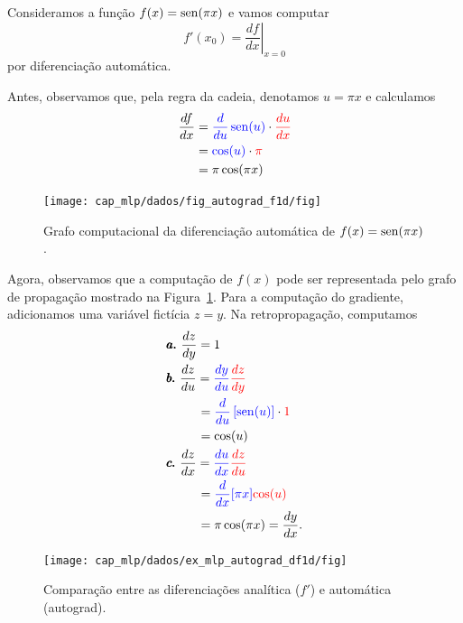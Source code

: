 \begin{ex}\label{ex:mlp_autograd_df1d}
  Consideramos a função $f(x) = \operatorname{sen}(\pi x)$ e vamos computar
  \begin{equation}
    f'(x_0) = \left.\frac{d f}{d x}\right|_{x=0}
  \end{equation}
  por diferenciação automática.

  Antes, observamos que, pela regra da cadeia, denotamos $u = \pi x$ e calculamos
  \begin{align}
    \frac{df}{dx} &= {\color{blue}\frac{d}{du}\operatorname{sen}(u)}\cdot{\color{red}\frac{d u}{dx}}\\
                  &= {\color{blue}\cos(u)}\cdot{\color{red}\pi} \\
                  &= \pi\cos(\pi x)
  \end{align}

  \begin{figure}[H]
    \centering
    \texttt{[image: cap\_mlp/dados/fig\_autograd\_f1d/fig]}
    \caption{Grafo computacional da diferenciação automática de $f(x) = \operatorname{sen}(\pi x)$.}
    \label{fig:autograd_f1d}
  \end{figure}  

  Agora, observamos que a computação de $f(x)$ pode ser representada pelo grafo de propagação mostrado na Figura~\ref{fig:autograd_f1d}. Para a computação do gradiente, adicionamos uma variável fictícia $z = y$. Na retropropagação, computamos
  \begin{subequations}
    \begin{align}
      &\pmb{a.} ~\frac{dz}{dy} = 1\\
      &\pmb{b.} ~\frac{dz}{du} = {\color{blue}\frac{dy}{du}}{\color{red}\frac{dz}{dy}}\nonumber\\
      &\qquad\;\, = {\color{blue}\frac{d}{du}\left[\operatorname{sen}(u)\right]}\cdot {\color{red}1}\nonumber\\
      &\qquad\;\, = \cos(u)\\
      &\pmb{c.} ~\frac{dz}{dx} = {\color{blue}\frac{du}{dx}}{\color{red}\frac{dz}{du}}\\
      &\qquad\;\, = {\color{blue}\frac{d}{dx}[\pi x]}{\color{red}\cos(u)}\\
      &\qquad\;\, = \pi\cos(\pi x) = \frac{dy}{dx}.
    \end{align}
  \end{subequations}

  \begin{figure}[H]
    \centering
    \texttt{[image: cap\_mlp/dados/ex\_mlp\_autograd\_df1d/fig]}
    \caption{Comparação entre as diferenciações analítica ($f'$) e automática (autograd).}
    \label{fig:ex_mlp_autograd_df1d}
  \end{figure}


\end{ex}
